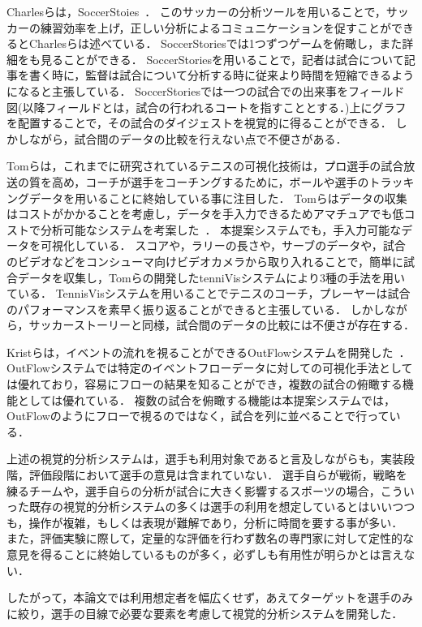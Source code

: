 \documentclass[sotsuron]{kuee}
\begin{document}
	Charlesらは，SoccerStoies~\cite{SoccerStory}．
	このサッカーの分析ツールを用いることで，サッカーの練習効率を上げ，正しい分析によるコミュニケーションを促すことができるとCharlesらは述べている．
	SoccerStoriesでは1つずつゲームを俯瞰し，また詳細をも見ることができる．
	SoccerStoriesを用いることで，記者は試合について記事を書く時に，監督は試合について分析する時に従来より時間を短縮できるようになると主張している．
	SoccerStoriesでは一つの試合での出来事をフィールド図(以降フィールドとは，試合の行われるコートを指すこととする．)上にグラフを配置することで，その試合のダイジェストを視覚的に得ることができる．
	しかしながら，試合間のデータの比較を行えない点で不便さがある．
	
	Tomらは，これまでに研究されているテニスの可視化技術は，プロ選手の試合放送の質を高め，コーチが選手をコーチングするために，ボールや選手のトラッキングデータを用いることに終始している事に注目した．
	Tomらはデータの収集はコストがかかることを考慮し，データを手入力できるためアマチュアでも低コストで分析可能なシステムを考案した~\cite{TenniVis}．
	本提案システムでも，手入力可能なデータを可視化している．
	スコアや，ラリーの長さや，サーブのデータや，試合のビデオなどをコンシューマ向けビデオカメラから取り入れることで，簡単に試合データを収集し，Tomらの開発したtenniVisシステムにより3種の手法を用いている．
	TennisVisシステムを用いることでテニスのコーチ，プレーヤーは試合のパフォーマンスを素早く振り返ることができると主張している．
	しかしながら，サッカーストーリーと同様，試合間のデータの比較には不便さが存在する．
	
	Kristらは，イベントの流れを視ることができるOutFlowシステムを開発した~\cite{Outflow}．
	OutFlowシステムでは特定のイベントフローデータに対しての可視化手法としては優れており，容易にフローの結果を知ることができ，複数の試合の俯瞰する機能としては優れている．
	複数の試合を俯瞰する機能は本提案システムでは，OutFlowのようにフローで視るのではなく，試合を列に並べることで行っている．

	上述の視覚的分析システムは，選手も利用対象であると言及しながらも，実装段階，評価段階において選手の意見は含まれていない．
	選手自らが戦術，戦略を練るチームや，選手自らの分析が試合に大きく影響するスポーツの場合，こういった既存の視覚的分析システムの多くは選手の利用を想定しているとはいいつつも，操作が複雑，もしくは表現が難解であり，分析に時間を要する事が多い．
	また，評価実験に際して，定量的な評価を行わず数名の専門家に対して定性的な意見を得ることに終始しているものが多く，必ずしも有用性が明らかとは言えない．
	
	したがって，本論文では利用想定者を幅広くせず，あえてターゲットを選手のみに絞り，選手の目線で必要な要素を考慮して視覚的分析システムを開発した．
	
\end{document}

